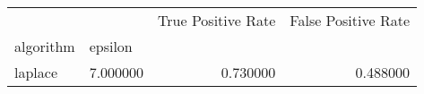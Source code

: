 \begin{tabular}{llrr}
\toprule
 &  & True Positive Rate & False Positive Rate \\
algorithm & epsilon &  &  \\
\midrule
laplace & 7.000000 & 0.730000 & 0.488000 \\
\cline{1-4}
\bottomrule
\end{tabular}
